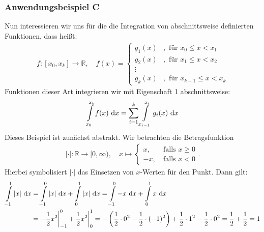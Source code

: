 \subsubsection*{Anwendungsbeispiel C}
Nun interessieren wir uns für die die Integration von abschnittsweise definierten Funktionen, dass heißt:
\begin{align*}
f:[x_0,x_k] \to \mathbb{R}, \quad
f(x)
= 
\begin{cases}
g_1(x) &, \text{ für } x_0 \leq x < x_1 \\
g_2(x) &, \text{ für } x_1 \leq x < x_2\\
\vdots  &\ \\
g_k(x) &,  \text{ für } x_{k-1} \leq x < x_k
\end{cases}
\end{align*}
Funktionen dieser Art integrieren wir mit Eigenschaft 1 abschnittsweise:
\begin{align*}
\int \limits_{x_0}^{x_k} f(x) \ \text{\rmfamily d} x
= \sum \limits_{i=1}^k \int \limits_{x_{i-1}}^{x_i} g_i(x) \ \text{\rmfamily d} x
\end{align*}
Dieses Beispiel ist zunächst abstrakt.
Wir betrachten die Betragsfunktion
\begin{align*}
| \cdot | : \mathbb{R} \to [0,\infty) 
, \quad
x \mapsto 
\begin{cases}
x, &\ \text{falls } x \geq 0\\
-x, &\ \text{falls }  x < 0
\end{cases}.
\end{align*}
Hierbei symbolisiert $|\cdot |$ das Einsetzen von $x$-Werten für den Punkt.
Dann gilt:
\begin{align*}
\int \limits_{-1}^1 |x| \ \text{\rmfamily d} x
&= \int \limits_{-1}^0 |x| \ \text{\rmfamily d} x
+ \int \limits_{0}^1 |x| \ \text{\rmfamily d} x
=\int \limits_{-1}^0 -x \ \text{\rmfamily d} x
+ \int \limits_{0}^1 x \ \text{\rmfamily d} x\\
&=
- \frac{1}{2} x^2 \bigg|_{-1}^0 + \frac{1}{2} x^2 \bigg|_{0}^1
=
-\left(\frac{1}{2} \cdot 0^2 - \frac{1}{2} \cdot  (-1)^2 \right)
+
\frac{1}{2} \cdot 1^2 - \frac{1}{2} \cdot 0^2
= \frac{1}{2} + \frac{1}{2} = 1
\end{align*}


\newpage

